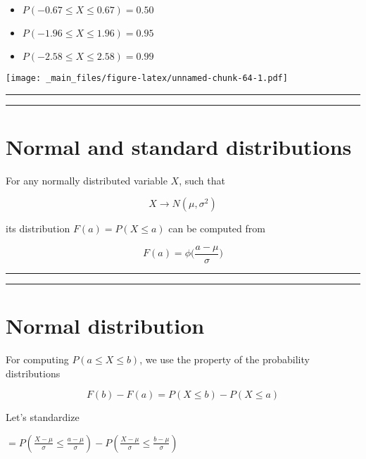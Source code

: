\documentclass[
]{book}
\providecommand{\tightlist}{%
  \setlength{\itemsep}{0pt}\setlength{\parskip}{0pt}}
\begin{document}
\begin{itemize}
\tightlist
\item
  \(P(-0.67 \leq X \leq 0.67)=0.50\)
\item
  \(P(-1.96 \leq X \leq 1.96)=0.95\)
\item
  \(P(-2.58 \leq X \leq 2.58)=0.99\)
\end{itemize}

\texttt{[image: \_main\_files/figure-latex/unnamed-chunk-64-1.pdf]}

\begin{center}\rule{0.5\linewidth}{0.5pt}\end{center}

\begin{center}\rule{0.5\linewidth}{0.5pt}\end{center}

\hypertarget{normal-and-standard-distributions}{%
\section{Normal and standard distributions}\label{normal-and-standard-distributions}}

For any normally distributed variable \(X\), such that

\[X\rightarrow N(\mu, \sigma^2)\]

its distribution \(F(a)=P(X \leq a)\) can be computed from

\[F(a)= \phi \big(\frac{a-\mu}{\sigma}\big)\]

\begin{center}\rule{0.5\linewidth}{0.5pt}\end{center}

\begin{center}\rule{0.5\linewidth}{0.5pt}\end{center}

\hypertarget{normal-distribution-7}{%
\section{Normal distribution}\label{normal-distribution-7}}

For computing \(P(a\leq X \leq b)\), we use the property of the probability distributions

\[F(b)-F(a)=P(X\leq b)-P(X\leq a)\]

Let's standardize

\(=P(\frac{X-\mu}{\sigma}\leq \frac{a-\mu}{\sigma})-P(\frac{X-\mu}{\sigma}\leq \frac{b-\mu}{\sigma})\)
\end{document}

